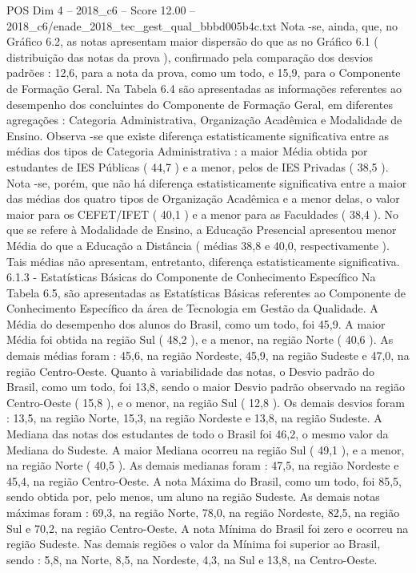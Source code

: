 \begin{textsample}{POS Dim 4 – 2018\_c6 – Score 12.00 – 2018\_c6/enade\_2018\_tec\_gest\_qual\_bbbd005b4c.txt}
Nota -se, ainda, que, no Gráfico 6.2, as notas apresentam maior dispersão do que as no Gráfico 6.1 ( distribuição das notas da prova ), confirmado pela comparação dos desvios padrões : 12,6, para a nota da prova, como um todo, e 15,9, para o Componente de Formação Geral.
Na Tabela 6.4 são apresentadas as informações referentes ao desempenho dos concluintes do Componente de Formação Geral, em diferentes agregações : Categoria Administrativa, Organização Acadêmica e Modalidade de Ensino.
Observa -se que existe diferença estatisticamente significativa entre as médias dos tipos de Categoria Administrativa : a maior Média obtida por estudantes de IES Públicas ( 44,7 ) e a menor, pelos de IES Privadas ( 38,5 ).
Nota -se, porém, que não há diferença estatisticamente significativa entre a maior das médias dos quatro tipos de Organização Acadêmica e a menor delas, o valor maior para os CEFET/IFET ( 40,1 ) e a menor para as Faculdades ( 38,4 ).
No que se refere à Modalidade de Ensino, a Educação Presencial apresentou menor Média do que a Educação a Distância ( médias 38,8 e 40,0, respectivamente ).
Tais médias não apresentam, entretanto, diferença estatisticamente significativa. 6.1.3 - Estatísticas Básicas do Componente de Conhecimento Específico Na Tabela 6.5, são apresentadas as Estatísticas Básicas referentes ao Componente de Conhecimento Específico da área de Tecnologia em Gestão da Qualidade.
A Média do desempenho dos alunos do Brasil, como um todo, foi 45,9.
A maior Média foi obtida na região Sul ( 48,2 ), e a menor, na região Norte ( 40,6 ).
As demais médias foram : 45,6, na região Nordeste, 45,9, na região Sudeste e 47,0, na região Centro-Oeste.
Quanto à variabilidade das notas, o Desvio padrão do Brasil, como um todo, foi 13,8, sendo o maior Desvio padrão observado na região Centro-Oeste ( 15,8 ), e o menor, na região Sul ( 12,8 ).
Os demais desvios foram : 13,5, na região Norte, 15,3, na região Nordeste e 13,8, na região Sudeste.
A Mediana das notas dos estudantes de todo o Brasil foi 46,2, o mesmo valor da Mediana do Sudeste.
A maior Mediana ocorreu na região Sul ( 49,1 ), e a menor, na região Norte ( 40,5 ).
As demais medianas foram : 47,5, na região Nordeste e 45,4, na região Centro-Oeste.
A nota Máxima do Brasil, como um todo, foi 85,5, sendo obtida por, pelo menos, um aluno na região Sudeste.
As demais notas máximas foram : 69,3, na região Norte, 78,0, na região Nordeste, 82,5, na região Sul e 70,2, na região Centro-Oeste.
A nota Mínima do Brasil foi zero e ocorreu na região Sudeste.
Nas demais regiões o valor da Mínima foi superior ao Brasil, sendo : 5,8, na Norte, 8,5, na Nordeste, 4,3, na Sul e 13,8, na Centro-Oeste.

\end{textsample}
